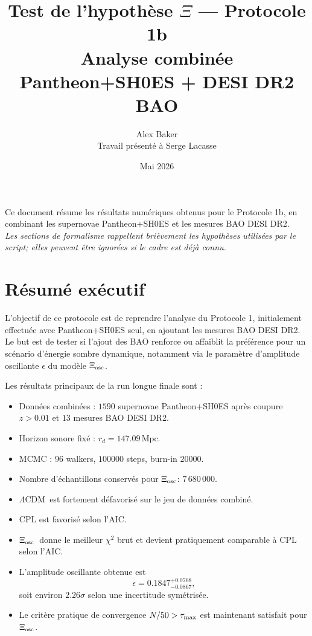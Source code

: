 \documentclass[11pt]{article}
\title{\textbf{Test de l'hypothèse $\Xi$ — Protocole 1b}\\
\large Analyse combinée Pantheon+SH0ES + DESI DR2 BAO}
\author{Alex Baker\\{\small Travail présenté à Serge Lacasse}}
\date{Mai 2026}
\newcommand{\LCDM}{$\Lambda$CDM}
\newcommand{\Xiosc}{$\Xi_{\rm osc}$}
\newcommand{\rd}{r_d}
\begin{document}
\maketitle

\vspace{-1em}
\begin{center}
\small
Ce document résume les résultats numériques obtenus pour le Protocole 1b, en combinant les supernovae Pantheon+SH0ES et les mesures BAO DESI DR2.\\
\textit{Les sections de formalisme rappellent brièvement les hypothèses utilisées par le script; elles peuvent être ignorées si le cadre est déjà connu.}
\end{center}

\section{Résumé exécutif}

L'objectif de ce protocole est de reprendre l'analyse du Protocole 1, initialement effectuée avec Pantheon+SH0ES seul, en ajoutant les mesures BAO DESI DR2. Le but est de tester si l'ajout des BAO renforce ou affaiblit la préférence pour un scénario d'énergie sombre dynamique, notamment via le paramètre d'amplitude oscillante $\epsilon$ du modèle \Xiosc.

Les résultats principaux de la run longue finale sont :

\begin{itemize}
    \item Données combinées : $1590$ supernovae Pantheon+SH0ES après coupure $z>0.01$ et $13$ mesures BAO DESI DR2.
    \item Horizon sonore fixé : $\rd = 147.09\,\mathrm{Mpc}$.
    \item MCMC : $96$ walkers, $100000$ steps, burn-in $20000$.
    \item Nombre d'échantillons conservés pour \Xiosc : $7\,680\,000$.
    \item \LCDM\ est fortement défavorisé sur le jeu de données combiné.
    \item CPL est favorisé selon l'AIC.
    \item \Xiosc\ donne le meilleur $\chi^2$ brut et devient pratiquement comparable à CPL selon l'AIC.
    \item L'amplitude oscillante obtenue est
    \[
        \epsilon = 0.1847^{+0.0768}_{-0.0867},
    \]
    soit environ $2.26\sigma$ selon une incertitude symétrisée.
    \item Le critère pratique de convergence $N/50>\tau_{\rm max}$ est maintenant satisfait pour \Xiosc.
\end{itemize}
\end{document}
